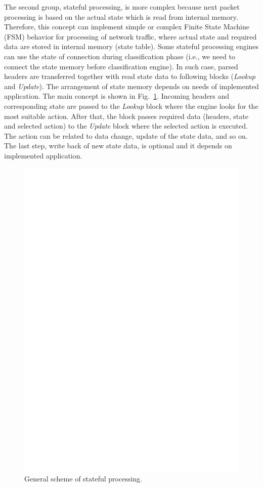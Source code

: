 The second group, stateful processing, is more complex because next packet processing is based on the actual state which is read from internal 
memory. Therefore, this concept can implement simple or complex Finite State Machine (FSM) behavior for processing of network traffic,
where actual state and required data are stored in internal memory (state table). 
Some stateful processing engines can use the state of connection during classification phase 
(i.e., we need to connect the state memory before classification engine).
In such case, parsed headers are transferred together with read state data to following blocks (\textit{Lookup} and \textit{Update}).
The arrangement of state memory depends on needs of implemented application. The main concept is shown in Fig.~\ref{fig:StatefulProcessing}. 
Incoming headers and corresponding state are passed to the \textit{Lookup} block where the engine looks for the most suitable action. 
After that, the block passes required data (headers, state and selected action) to the \textit{Update} block where the selected action is executed. 
The action can be related to data change, update of the state data, and so on. 
The last step, write back of new state data, is optional and it depends on implemented application.

\begin{figure}[ht]
    \centering
    \includegraphics[scale=0.75]{chapters/pic/StatefulProcessing}
    \caption{General scheme of stateful processing.}
    \label{fig:StatefulProcessing}
\end{figure}


